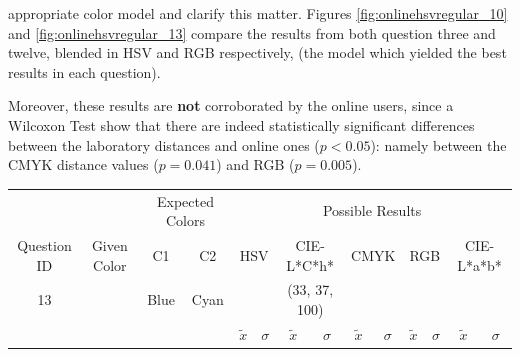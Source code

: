 appropriate color model and clarify this matter. Figures \ref{fig:onlinehsvregular_10} and \ref{fig:onlinehsvregular_13} compare the results from both question three and twelve, blended in HSV and RGB respectively,
(the model which yielded the best results in each question). \par
%
Moreover, these results are \textbf{not} corroborated by the online users, since a Wilcoxon Test show that there are indeed statistically significant differences between the laboratory distances
and online ones ($p < 0.05$): namely between the CMYK distance values ($p = 0.041$) and RGB ($p = 0.005$).
%
\begin{table}[H]
  \resizebox{\textwidth}{!} {
  \begin{tabular}{lccccccccccccc}
    \hline
    \multicolumn{1}{c}{}                              &                                      & \multicolumn{2}{c}{Expected Colors}                   & \multicolumn{10}{c}{Possible Results}                                                                                                                                                                                                                                                                                        \\ \cline{3-14}
    \multicolumn{1}{c}{\multirow{-2}{*}{Question ID}} & \multirow{-2}{*}{Given Color}        & C1                       & C2                         & \multicolumn{2}{c}{HSV}                                        & \multicolumn{2}{c}{CIE-L*C*h*}                                 & \multicolumn{2}{c}{CMYK}                                       & \multicolumn{2}{c}{RGB}                                        & \multicolumn{2}{c}{CIE-L*a*b*}                                 \\ \hline
    \multicolumn{1}{c}{13}                             & \cellcolor[HTML]{0080FF}{\color[HTML]{FFFFFF}(26, 23, 98)} & \multicolumn{1}{c|}{Blue} & \multicolumn{1}{c|}{Cyan}  & \multicolumn{2}{c|}{\cellcolor[HTML]{0080FF}{\color[HTML]{FFFFFF}(26, 23, 98)}}      & \multicolumn{2}{c|}{\cellcolor[HTML]{00ACFF}(33, 37, 100)}       & \multicolumn{2}{c|}{\cellcolor[HTML]{0080FF}{\color[HTML]{FFFFFF}(26, 23, 98)}}       & \multicolumn{2}{c|}{\cellcolor[HTML]{0080FF}{\color[HTML]{FFFFFF}(26, 23, 98)}}       & \multicolumn{2}{c|}{\cellcolor[HTML]{5792FF}{\color[HTML]{FFFFFF}(32, 30, 99)}}       \\ \hline
                                                      & \multicolumn{1}{l}{}                 & \multicolumn{1}{l}{}     & \multicolumn{1}{l}{}       & \multicolumn{1}{c}{$\tilde{x}$} & \multicolumn{1}{c}{$\sigma$} & \multicolumn{1}{c}{$\tilde{x}$} & \multicolumn{1}{c}{$\sigma$} & \multicolumn{1}{c}{$\tilde{x}$} & \multicolumn{1}{c}{$\sigma$} & \multicolumn{1}{c}{$\tilde{x}$} & \multicolumn{1}{c}{$\sigma$} & \multicolumn{1}{c}{$\tilde{x}$} & \multicolumn{1}{c}{$\sigma$} \\ \hline

\end{tabular}}
\end{table}
